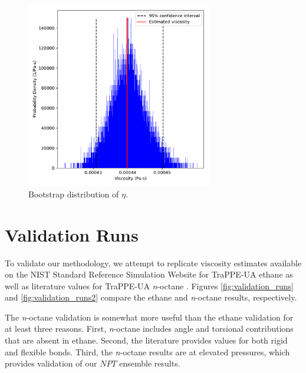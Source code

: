 \documentclass[preprint,review,12pt]{elsarticle}
\begin{document}
	\begin{figure}[htb!]
		\centering
		\includegraphics[width=3.2in]{GK_bootstraps_MCMC_rho0.pdf}
		\caption{Bootstrap distribution of $\eta$.}
		\label{fig:bootstraps}
	\end{figure} 

%	
	

    \clearpage
	\newpage

	\section{Validation Runs} \label{Validation Runs}
	
	To validate our methodology, we attempt to replicate viscosity estimates available on the NIST Standard Reference Simulation Website \cite{NIST_SRSW} for TraPPE-UA ethane as well as literature values for TraPPE-UA \textit{n}-octane \cite{Kioupis2000,Nieto2006}. Figures \ref{fig:validation_runs} and \ref{fig:validation_runs2} compare the ethane and \textit{n}-octane results, respectively.
	
	The \textit{n}-octane validation is somewhat more useful than the ethane validation for at least three reasons. First, \textit{n}-octane includes angle and torsional contributions that are absent in ethane. Second, the literature provides values for both rigid and flexible bonds. Third, the \textit{n}-octane results are at elevated pressures, which provides validation of our $NPT$ ensemble results. 
	
\end{document}
